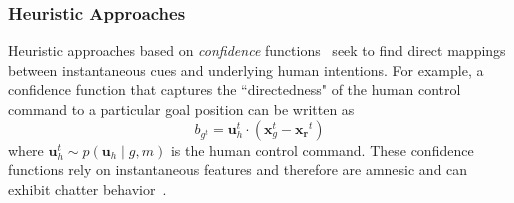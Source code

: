 \documentclass[conference]{IEEEtran}
\newcommand{\norm}[1]{\left\lVert#1\right\rVert}
\begin{document}
\subsubsection{Heuristic Approaches}
Heuristic approaches based on \textit{confidence} functions~\citep{dragan2013policy} seek to find direct mappings between instantaneous cues and underlying human intentions. 
For example, a confidence function that captures the ``directedness" of the human control command to a particular goal position can be written as 
% 
\begin{equation*}
b_{g^t} =  \boldsymbol{u}_h^t\cdot(\boldsymbol{x}_{g}^t - \boldsymbol{x_r}^t)
\end{equation*}
where $\boldsymbol{u}_h^t \sim p(\boldsymbol{u}_h\;|\;g, m)$ is the human control command. These confidence functions rely on instantaneous features and therefore are amnesic and can exhibit chatter behavior~\citep{dragan2012formalizing}. 

\end{document}
